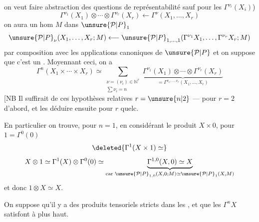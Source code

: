 on veut faire abstraction des questions de représentabilité sauf pour les $\Gamma^{\nu_i}(X_i)$)
\[\Gamma^{\nu_1}(X_1)\otimes\cdots\otimes\Gamma^{\nu_r}(X_r)\longleftarrow\Gamma^\nu(X_1,\ldots,X_r)\]
on aura un hom  $M$ dans $\unsure{\mathcal P|P}_1$
\[\unsure{\mathcal P|P}_\nu(X_1,\ldots,X_r;M)\longleftarrow \unsure{\mathcal P|P}_{1,\ldots,1}(\Gamma^{\nu_1}X_1,\ldots,\Gamma^{\nu_r}X_r;M)\]
par composition avec les applications canoniques de $\unsure{\mathcal P|P}$
et on suppose que c'est un . Moyennant ceci, on a
\[\Gamma^n(X_1\times\cdots\times X_r)\simeq\sum_{\substack{\nu=(\nu_i)\in\mathbb N^r\\\sum\nu_i=n}}\underbrace{\Gamma^{\nu_1}(X_1)\otimes\cdots\otimes\Gamma^{\nu_r}(X_r)}_{=\Gamma^{\nu_1,\ldots,\nu_r}(X_1,\ldots,X_r)}\]
[NB Il suffirait de  ces hypothèses relatives $r=\unsure{n|2}$ --- pour $r=2$ d'abord, et les déduire ensuite pour $r$ quelc.

En particulier on trouve, pour $n=1$, en considérant le produit $X\times0$, pour $1=\Gamma^0(0)$
\[\deleted{\Gamma^1(X\times1)\simeq}\]
\[X\otimes1\simeq\Gamma^1(X)\otimes\Gamma^0(0)\simeq\underbrace{\Gamma^{1,0}(X,0)\simeq X}_{\text{car }\unsure{\mathcal P|P}_{1,0}(X,0;M)\simeq \unsure{\mathcal P|P}_1(X,M)}\]
et donc $1\otimes X\simeq X$.  

On suppose qu'il y a des produits tensoriels stricts dans les , et que les $\Gamma^nX$ satisfont à  plus haut.

